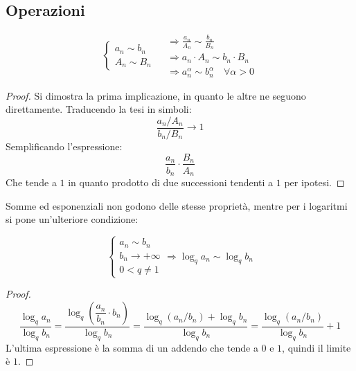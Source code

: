 \subsection{Operazioni}
\begin{prop}
	\[
		\begin{cases}
			a_n\sim b_n \\
			A_n\sim B_n
		\end{cases}
		\begin{aligned}
			 & \Rightarrow\frac{a_n}{A_n}\sim\frac{b_n}{B_n}             \\
			 & \Rightarrow a_n\cdot A_n\sim b_n\cdot B_n                 \\
			 & \Rightarrow a_n^\alpha\sim b_n^\alpha\quad\forall\alpha>0
		\end{aligned}
	\]
\end{prop}
\begin{proof}
	Si dimostra la prima implicazione, in quanto le altre ne seguono direttamente. Traducendo la tesi in simboli:
	\[
		\frac{a_n/A_n}{b_n/B_n}\to1
	\]
	Semplificando l'espressione:
	\[
		\frac{a_n}{b_n}\cdot \frac{B_n}{A_n}
	\]
	Che tende a $1$ in quanto prodotto di due successioni tendenti a $1$ per ipotesi.
\end{proof}
Somme ed esponenziali non godono delle stesse proprietà, mentre per i logaritmi si pone un'ulteriore condizione:
\begin{prop}
	\[
		\begin{cases}
			a_n\sim b_n   \\
			b_n\to+\infty \\
			0<q\neq1
		\end{cases}\Rightarrow\log_qa_n\sim\log_qb_n
	\]
\end{prop}
\begin{proof}
	\[
		\frac{\log_qa_n}{\log_qb_n}=\frac{\log_q\left(\dfrac{a_n}{b_n}\cdot b_n\right)}{\log_qb_n}=\frac{\log_q(a_n/b_n)+\log_qb_n}{\log_qb_n}=\frac{\log_q(a_n/b_n)}{\log_qb_n}+1
	\]
	L'ultima espressione è la somma di un addendo che tende a $0$ e $1$, quindi il limite è $1$.
\end{proof}

